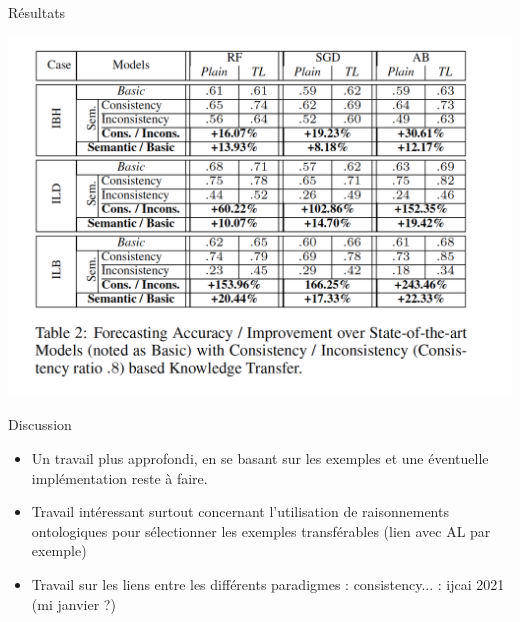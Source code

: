 \documentclass{beamer}
\begin{document}
\begin{frame}{Résultats}

 \centering
    \includegraphics[scale=0.4]{Figures/result.png}

\end{frame}


\begin{frame}{Discussion}
\begin{itemize}
    \item Un travail plus approfondi, en se basant sur les exemples et une éventuelle implémentation reste à faire.
    \item Travail intéressant surtout concernant l'utilisation de raisonnements ontologiques pour sélectionner les exemples transférables (lien avec AL par exemple)
    \item Travail sur les liens entre les différents paradigmes : consistency... : ijcai 2021 (mi janvier ?)
    
\end{itemize}


\end{frame}



\end{document}
